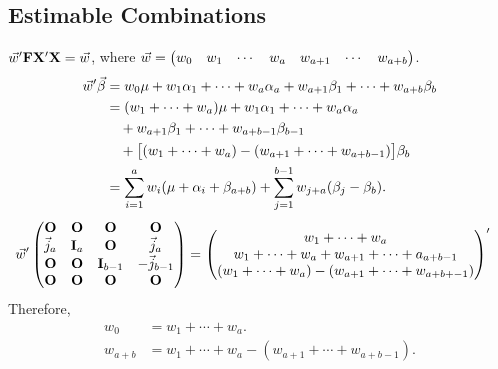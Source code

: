 \subsection*{Estimable Combinations}
$ \vec{w}'\mathbf{F}\mathbf{X}'\mathbf{X}=\vec{w} $,
where $ \vec{w}=\begin{pmatrix}
        w_0 & w_1 & \cdots & w_a & w_{a+1} & \cdots & w_{a+b}
    \end{pmatrix} $.
\begin{align*}
    \vec{w}'\vec{\beta}
     & =w_0\mu+w_1\alpha_1+\cdots+w_a\alpha_a+w_{a+1}\beta_1+\cdots+w_{a+b}\beta_b            \\
     & =(w_1+\cdots+w_a)\mu+w_1\alpha_1+\cdots+w_a\alpha_a                                    \\
     & \quad+ w_{a+1}\beta_1+\cdots+w_{a+b-1}\beta_{b-1}                                      \\
     & \quad+\bigl[(w_1+\cdots+w_a)-(w_{a+1}+\cdots+w_{a+b-1})\bigr]\beta_b                   \\
     & =\sum_{i=1}^{a}w_i(\mu+\alpha_i+\beta_{a+b})+\sum_{j=1}^{b-1}w_{j+a}(\beta_j-\beta_b).
\end{align*}
\begin{align*}
    \vec{w}'\begin{pmatrix}
                   \mathbf{O}   & \mathbf{O}   & \mathbf{O}       & \mathbf{O}        \\
                   \vec{j}_a & \mathbf{I}_a & \mathbf{O}       & \vec{j}_a      \\
                   \mathbf{O}   & \mathbf{O}   & \mathbf{I}_{b-1} & -\vec{j}_{b-1} \\
                   \mathbf{O}   & \mathbf{O}   & \mathbf{O}       & \mathbf{O}
               \end{pmatrix}
     & =\begin{pmatrix}
            w_1+\cdots+w_a                          \\
            w_1+\cdots+w_a+w_{a+1}+\cdots+a_{a+b-1} \\
            (w_1+\cdots+w_a)-(w_{a+1}+\cdots+w_{a+b+-1})
        \end{pmatrix}'
\end{align*}
Therefore,
\begin{align*}
    w_0     & =w_1+\cdots+w_a.                            \\
    w_{a+b} & =w_1+\cdots+w_a-(w_{a+1}+\cdots+w_{a+b-1}).
\end{align*}
